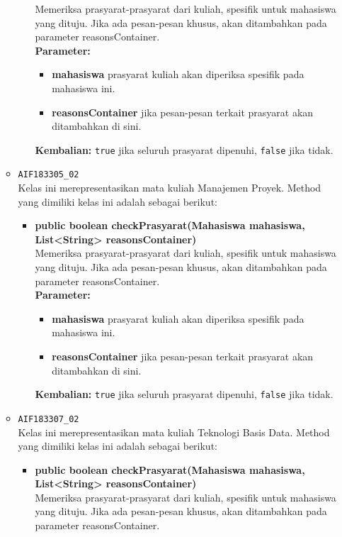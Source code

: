 \begin{enumerate}
\begin{itemize}
\begin{itemize}
			Memeriksa prasyarat-prasyarat dari kuliah, spesifik untuk mahasiswa yang dituju. Jika ada pesan-pesan khusus, akan ditambahkan pada parameter reasonsContainer.\\
			\textbf{Parameter:}
			\begin{itemize}
				\item \textbf{mahasiswa} prasyarat kuliah akan diperiksa spesifik pada mahasiswa ini.
				\item \textbf{reasonsContainer} jika pesan-pesan terkait prasyarat akan ditambahkan di sini.
			\end{itemize}
			\textbf{Kembalian:} \texttt{true} jika seluruh prasyarat dipenuhi, \texttt{false} jika tidak.
		\end{itemize}
		\item \texttt{AIF183305\_02} \\
		Kelas ini merepresentasikan mata kuliah Manajemen Proyek. Method yang dimiliki kelas ini adalah sebagai berikut: 
		\begin{itemize}
			\item \textbf{public boolean checkPrasyarat(Mahasiswa mahasiswa, List<String> reasonsContainer)}\\
			Memeriksa prasyarat-prasyarat dari kuliah, spesifik untuk mahasiswa yang dituju. Jika ada pesan-pesan khusus, akan ditambahkan pada parameter reasonsContainer.\\
			\textbf{Parameter:}
			\begin{itemize}
				\item \textbf{mahasiswa} prasyarat kuliah akan diperiksa spesifik pada mahasiswa ini.
				\item \textbf{reasonsContainer} jika pesan-pesan terkait prasyarat akan ditambahkan di sini.
			\end{itemize}
			\textbf{Kembalian:} \texttt{true} jika seluruh prasyarat dipenuhi, \texttt{false} jika tidak.
		\end{itemize}
		\item \texttt{AIF183307\_02} \\
		Kelas ini merepresentasikan mata kuliah Teknologi Basis Data. Method yang dimiliki kelas ini adalah sebagai berikut: 
		\begin{itemize}
			\item \textbf{public boolean checkPrasyarat(Mahasiswa mahasiswa, List<String> reasonsContainer)}\\
			Memeriksa prasyarat-prasyarat dari kuliah, spesifik untuk mahasiswa yang dituju. Jika ada pesan-pesan khusus, akan ditambahkan pada parameter reasonsContainer.\\

\end{itemize}
\end{itemize}
\end{enumerate}
